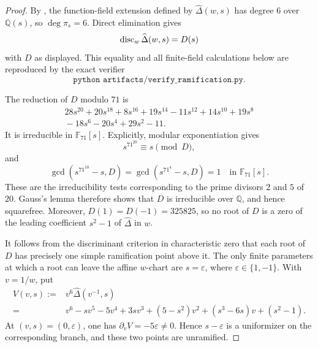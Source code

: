 \begin{proof}
By , the function-field extension defined
by \(\widehat\Delta(w,s)\) has degree \(6\) over \(\mathbb Q(s)\), so
\(\deg\pi_s=6\). Direct elimination gives
\[
  \operatorname{disc}_w\widehat\Delta(w,s)=D(s)
\]
with \(D\) as displayed. This equality and all finite-field calculations
below are reproduced by the exact verifier
\[
  \texttt{python artifacts/verify\_ramification.py}.
\]

The reduction of \(D\) modulo \(71\) is
\[
\begin{aligned}
  28s^{20}+20s^{18}+8s^{16}+19s^{14}-11s^{12}+14s^{10}
  +19s^8\\
  {}-18s^6-20s^4+29s^2-11.
\end{aligned}
\]
It is irreducible in \(\mathbb F_{71}[s]\). Explicitly, modular
exponentiation gives
\[
  s^{71^{20}}\equiv s\pmod D,
\]
and
\[
  \gcd(s^{71^{10}}-s,D)=\gcd(s^{71^4}-s,D)=1
  \quad\text{in }\mathbb F_{71}[s].
\]
These are the irreducibility tests corresponding to the prime divisors
\(2\) and \(5\) of \(20\). Gauss's lemma therefore shows that \(D\) is
irreducible over \(\mathbb Q\), and hence squarefree. Moreover,
\(D(1)=D(-1)=325825\), so no root of \(D\) is a zero of the leading
coefficient \(s^2-1\) of \(\widehat\Delta\) in \(w\).

It follows from the discriminant criterion in characteristic zero that
each root of \(D\) has precisely one simple ramification point above it.
The only finite parameters at which a root can leave the affine
\(w\)-chart are \(s=\varepsilon\), where \(\varepsilon\in\{1,-1\}\).
With \(v=1/w\), put
\[
\begin{aligned}
  V(v,s):={}&v^6\widehat\Delta(v^{-1},s)\\
  ={}&v^6-sv^5-5v^4+3sv^3+(5-s^2)v^2
       +(s^3-6s)v+(s^2-1).
\end{aligned}
\]
At \((v,s)=(0,\varepsilon)\), one has
\(\partial_vV=-5\varepsilon\ne0\). Hence \(s-\varepsilon\) is a
uniformizer on the corresponding branch, and these two points are
unramified.


\end{proof}
